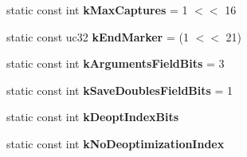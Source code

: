 \begin{DoxyCompactItemize}
\item 
static const int {\bfseries k\+Max\+Captures} = 1 $<$$<$ 16\hypertarget{classv8_1_1internal_1_1_b_a_s_e___e_m_b_e_d_d_e_d_a7dafef8ec893caca1f588d8ed51989c2}{}\label{classv8_1_1internal_1_1_b_a_s_e___e_m_b_e_d_d_e_d_a7dafef8ec893caca1f588d8ed51989c2}

\item 
static const uc32 {\bfseries k\+End\+Marker} = (1 $<$$<$ 21)\hypertarget{classv8_1_1internal_1_1_b_a_s_e___e_m_b_e_d_d_e_d_abd8d96d472d77c217f3d13e9e02a7f42}{}\label{classv8_1_1internal_1_1_b_a_s_e___e_m_b_e_d_d_e_d_abd8d96d472d77c217f3d13e9e02a7f42}

\item 
static const int {\bfseries k\+Arguments\+Field\+Bits} = 3\hypertarget{classv8_1_1internal_1_1_b_a_s_e___e_m_b_e_d_d_e_d_a7b84a9ac99dc5ed4ac40e0c3965d668c}{}\label{classv8_1_1internal_1_1_b_a_s_e___e_m_b_e_d_d_e_d_a7b84a9ac99dc5ed4ac40e0c3965d668c}

\item 
static const int {\bfseries k\+Save\+Doubles\+Field\+Bits} = 1\hypertarget{classv8_1_1internal_1_1_b_a_s_e___e_m_b_e_d_d_e_d_a9719001cc91cfdb9fdc450f2b18e325b}{}\label{classv8_1_1internal_1_1_b_a_s_e___e_m_b_e_d_d_e_d_a9719001cc91cfdb9fdc450f2b18e325b}

\item 
static const int {\bfseries k\+Deopt\+Index\+Bits}
\item 
static const int {\bfseries k\+No\+Deoptimization\+Index}
\end{DoxyCompactItemize}
